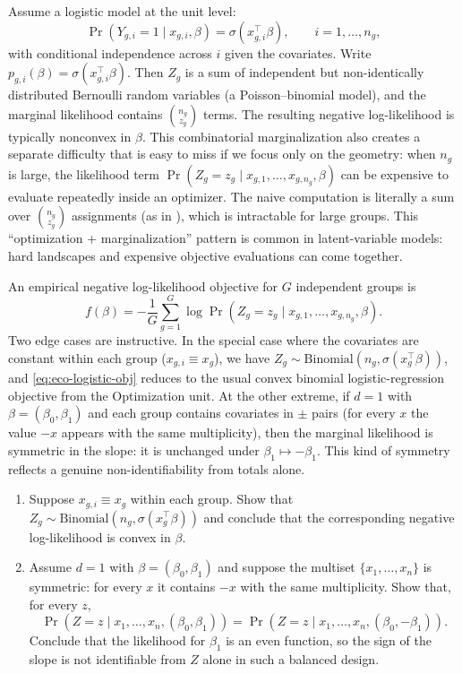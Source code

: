 \documentclass[11pt]{article}
\begin{document}
Assume a logistic model at the unit level:
\[
\Pr(Y_{g,i}=1\mid x_{g,i},\beta)=\sigma(x_{g,i}^\top\beta),
\qquad i=1,\dots,n_g,
\]
with conditional independence across $i$ given the covariates.
Write $p_{g,i}(\beta)=\sigma(x_{g,i}^\top\beta)$.
Then $Z_g$ is a sum of independent but non-identically distributed Bernoulli random variables (a Poisson--binomial model), and the marginal likelihood contains $\binom{n_g}{z_g}$ terms.
The resulting negative log-likelihood is typically nonconvex in $\beta$.
This combinatorial marginalization also creates a separate difficulty that is easy to miss if we focus only on the geometry:
when $n_g$ is large, the likelihood term $\Pr(Z_g=z_g\mid x_{g,1},\dots,x_{g,n_g},\beta)$ can be expensive to evaluate repeatedly inside an optimizer.
The naive computation is literally a sum over $\binom{n_g}{z_g}$ assignments (as in ), which is intractable for large groups.
This ``optimization + marginalization'' pattern is common in latent-variable models: hard landscapes and expensive objective evaluations can come together.

An empirical negative log-likelihood objective for $G$ independent groups is
\begin{equation}
  f(\beta)
  =
  -\frac{1}{G}\sum_{g=1}^G \log \Pr(Z_g=z_g \mid x_{g,1},\dots,x_{g,n_g},\beta).
  \label{eq:eco-logistic-obj}
\end{equation}
Two edge cases are instructive.
In the special case where the covariates are constant within each group ($x_{g,i}\equiv x_g$), we have
$Z_g\sim \mathrm{Binomial}(n_g,\sigma(x_g^\top\beta))$, and \eqref{eq:eco-logistic-obj} reduces to the usual convex binomial logistic-regression objective from the Optimization unit.
At the other extreme, if $d=1$ with $\beta=(\beta_0,\beta_1)$ and each group contains covariates in $\pm$ pairs (for every $x$ the value $-x$ appears with the same multiplicity), then the marginal likelihood is symmetric in the slope: it is unchanged under $\beta_1\mapsto -\beta_1$.
This kind of symmetry reflects a genuine non-identifiability from totals alone.

\begin{exercise}
\label{ex:eco-logistic-edge-cases}
\begin{enumerate}[leftmargin=*]
  \item Suppose $x_{g,i}\equiv x_g$ within each group.
  Show that $Z_g\sim \mathrm{Binomial}(n_g,\sigma(x_g^\top\beta))$ and conclude that the corresponding negative log-likelihood is convex in $\beta$.
  \item Assume $d=1$ with $\beta=(\beta_0,\beta_1)$ and suppose the multiset $\{x_1,\dots,x_n\}$ is symmetric: for every $x$ it contains $-x$ with the same multiplicity.
  Show that, for every $z$,
  \[
    \Pr(Z=z\mid x_1,\dots,x_n,(\beta_0,\beta_1))
    =
    \Pr(Z=z\mid x_1,\dots,x_n,(\beta_0,-\beta_1)).
  \]
  Conclude that the likelihood for $\beta_1$ is an even function, so the sign of the slope is not identifiable from $Z$ alone in such a balanced design.
\end{enumerate}
\end{exercise}
\end{document}

